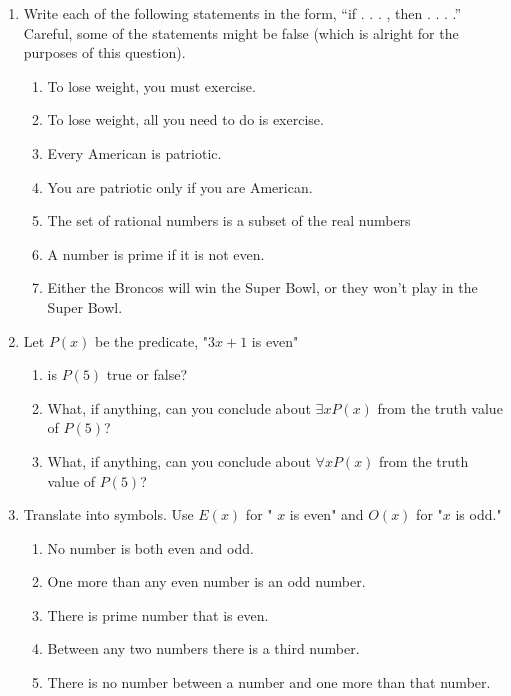 \documentclass[11pt, a4paper]{article}
\newcommand\setItemNumber[1]{\setcounter{enumi}{\numexpr#1-1\relax}}
\begin{document}
\begin{enumerate}
    \setItemNumber{10}
    \item Write each of the following statements in the form, “if . . . , then . . . .” Careful, some of the statements might be false (which is alright for the purposes of this question).
        \begin{enumerate}
            \item To lose weight, you must exercise.
            \item To lose weight, all you need to do is exercise.
            \item Every American is patriotic.
            \item You are patriotic only if you are American.
            \item The set of rational numbers is a subset of the real numbers
            \item A number is prime if it is not even.
            \item Either the Broncos will win the Super Bowl, or they won’t play in the Super Bowl.
        \end{enumerate}

    \setItemNumber{12}
    \item Let $P(x)$ be the predicate, "$3x + 1$ is even"
        \begin{enumerate}
            \item is $P(5)$ true or false?
            \item What, if anything, can you conclude about $\exists xP(x)$ from the truth value of $P(5)$?
            \item What, if anything, can you conclude about $\forall xP(x)$ from the truth value of $P(5)$?
        \end{enumerate}

    \setItemNumber{16}
    \item Translate into symbols. Use $E(x)$ for " $x$ is even" and $O(x)$ for "$x$ is odd."
        \begin{enumerate}
            \item No number is both even and odd.
            \item One more than any even number is an odd number.
            \item There is prime number that is even.
            \item Between any two numbers there is a third number.
            \item There is no number between a number and one more than that number.
        \end{enumerate}


\end{enumerate}
\end{document}
